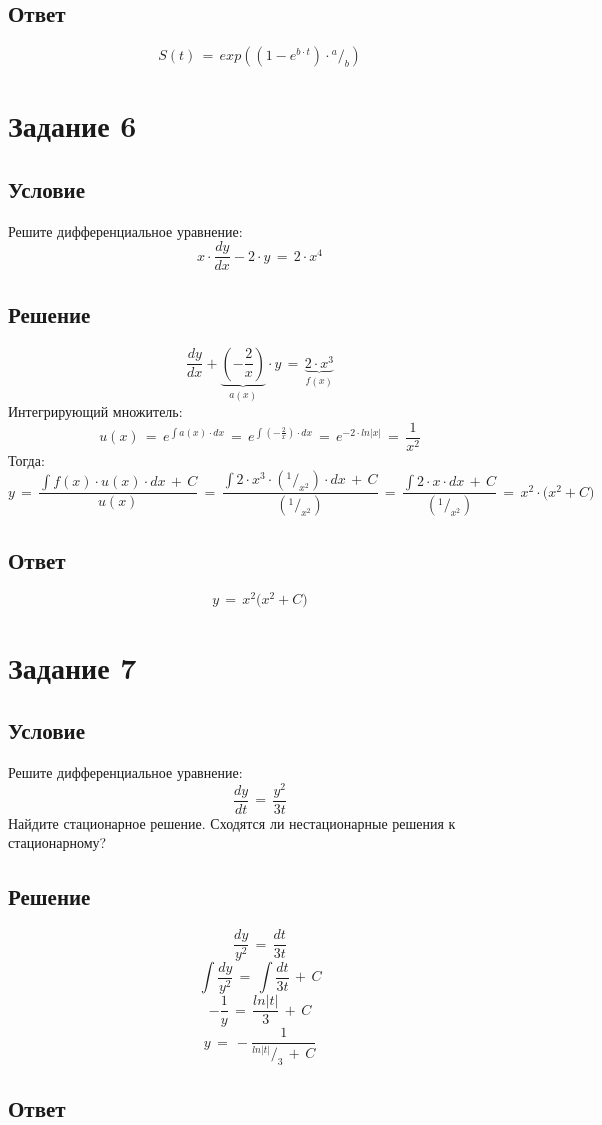 \documentclass{article}
\newcommand*\rfrac[2]{{}^{#1}\!/_{#2}}
\begin{document}
\subsection*{Ответ}
\[ S(t) \, = \, exp \left( (1 \! - \! e^{b \cdot t}) \! \cdot \rfrac{a}{b} \right) \]
\section*{Задание 6}
\subsection*{Условие}
Решите дифференциальное уравнение:
\[ x \! \cdot \! \dfrac{dy}{dx} \! - \! 2 \! \cdot \! y \, = \, 2 \! \cdot \! x^4 \]
\subsection*{Решение}
\[ \dfrac{dy}{dx} \! + \! \underbrace{\left( - \dfrac{2}{x} \right)}_{a(x)} \! \cdot y \, = \, \underbrace{2 \! \cdot \! x^3}_{f(x)} \]
Интегрирующий множитель:
\[ u(x) \, = \, e^{\int a(x) \cdot dx} \, = \, e^{\int \left( -\frac{2}{x} \right) \cdot dx} \, = \, e^{-2 \cdot ln|x|} \, = \, \dfrac{1}{x^2} \]
Тогда:
\[ y \, = \, \dfrac{\int f(x) \! \cdot \! u(x) \! \cdot \! dx \, + \, C}{u(x)} \, = \, \dfrac{\int 2 \! \cdot \! x^3 \! \cdot \! (\rfrac{1}{x^2}) \! \cdot \! dx \, + \, C}{(\rfrac{1}{x^2})} \, = \, \dfrac{\int 2 \! \cdot \! x \! \cdot \! dx \, + \, C}{(\rfrac{1}{x^2})} \, = \, x^2 \! \cdot \! \big( x^2 \! + \! C \big) \]
\subsection*{Ответ}
\[ y \, = \, x^2 \big( x^2 \! + \! C \big) \]
\section*{Задание 7}
\subsection*{Условие}
Решите дифференциальное уравнение: 
\[ \dfrac{dy}{dt} \, = \, \dfrac{y^2}{3t} \]
Найдите стационарное решение. Сходятся ли нестационарные решения к стационарному?
\subsection*{Решение}
\[ \dfrac{dy}{y^2} \, = \, \dfrac{dt}{3t} \]
\[ \int \dfrac{dy}{y^2} \, = \, \int \dfrac{dt}{3t} \, + \, C \]
\[ -\dfrac{1}{y} \, = \, \dfrac{ln|t|}{3} \, + \, C \]
\[ y \, = \, -\dfrac{1}{\rfrac{ln|t|}{3} \, + \, C} \]
\subsection*{Ответ}
\end{document}

